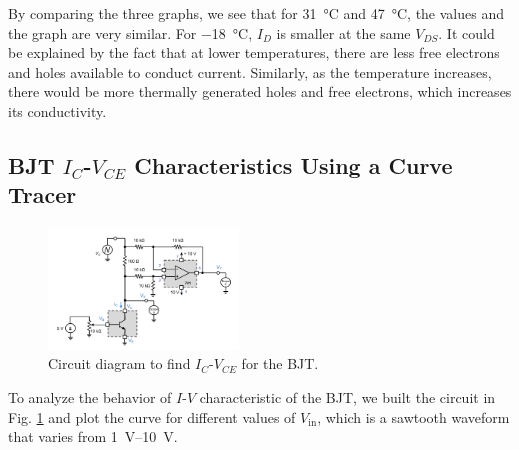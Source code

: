 \documentclass[journal]{IEEEtran}
\begin{document}
\par By comparing the three graphs, we see that for \SI{31}{\celsius} and
\SI{47}{\celsius}, the values and the graph are very similar. For
\SI{-18}{\celsius}, $I_{D}$ is smaller at the same $V_{DS}$. It could be
explained by the fact that at lower temperatures, there are less
free electrons and holes available to conduct current. Similarly,
as the temperature increases, there would be more thermally generated holes
and free electrons, which increases its conductivity.
\clearpage
\subsection{BJT $I_{C}$-$V_{CE}$ Characteristics Using a Curve Tracer}\label{sec-3}
\begin{figure}[h]
  \centering
  \includegraphics[width=0.45\textwidth]{images/3-1.png}
  \caption{Circuit diagram to find $I_{C}$-$V_{CE}$ for the BJT.}
  \label{fig-8}
\end{figure}
\par To analyze the behavior of $I$-$V$ characteristic of the BJT, we
built the circuit in Fig. \ref{fig-8} and plot the curve for different values
of $V_{\text{in}}$, which is a sawtooth waveform that varies from \SIrange{1}{10}{\volt}.
\clearpage
\end{document}
